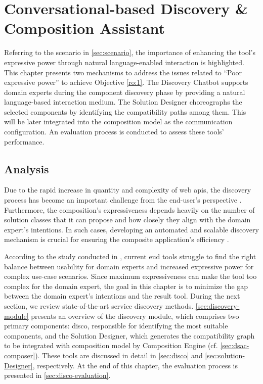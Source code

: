 \hypertarget{sec:dsac-discovery}{%
\chapter{Conversational-based Discovery \& Composition Assistant}\label{sec:dsac-discovery}}
Referring to the scenario in \cref{sec:scenario}, the importance of enhancing the tool’s expressive power through natural language-enabled interaction is highlighted. This chapter presents two mechanisms to address the issues related to “Poor expressive power” to achieve Objective \cref{ro:1}. The Discovery Chatbot supports domain experts during the component discovery phase by providing a natural language-based interaction medium. The Solution Designer choreographs the selected components by identifying the compatibility paths among them. This will be later integrated into the composition model as the communication configuration. An evaluation process is conducted to assess these tools’ performance.


\hypertarget{sec:disc.analysis}{%
\section{Analysis}\label{sec:disc.analysis}}
\vspace{10pt}
Due to the rapid increase in quantity and complexity of web \gls{api}s, the discovery process has become an important challenge from the end-user’s perspective \autocite{Fariss2018}. Furthermore, the composition’s expressiveness depends heavily on the number of solution classes that it can propose and how closely they align with the domain expert’s intentions. In such cases, developing an automated and scalable discovery mechanism is crucial for ensuring the composite application’s  efficiency \autocite{Zarei2020}. 

According to the study conducted in \autocite{Ponce2022}, current \gls{eud} tools struggle to find the right balance between usability for domain experts and increased expressive power for complex use-case scenarios. Since maximum expressiveness can make the tool too complex for the domain expert, the goal in this chapter is to minimize the gap between the domain expert’s intentions and the result tool. During the next section, we review state-of-the-art service discovery methods. \cref{sec:discovery-module} presents an overview of the discovery module, which comprises two primary components: \gls{disco}, responsible for identifying the most suitable components, and the Solution Designer, which generates the compatibility graph to be integrated with composition model by Composition Engine (cf. \cref{sec:dsac-composer}). These tools are discussed in detail in \cref{sec:disco} and \cref{sec:solution-Designer}, respectively. At the end of this chapter, the evaluation process is presented in \cref{sec:disco-evaluation}.


